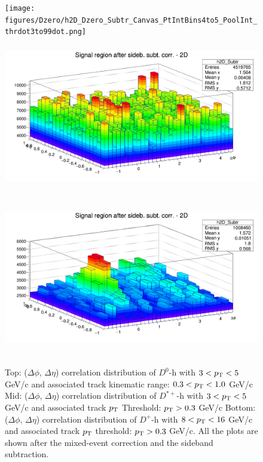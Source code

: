 \begin{figure}
\centering
{\texttt{[image: figures/Dzero/h2D\_Dzero\_Subtr\_Canvas\_PtIntBins4to5\_PoolInt\_thrdot3to99dot.png]}}
{\includegraphics[width=0.9\linewidth, height = 7cm]{figures/Dstar_wEFF/h2D_Dstar_Subtr_Canvas_PtIntBins2to3_PoolInt_thr0dot3to99dot0.png}}
{\includegraphics[width=0.9\linewidth, height = 7cm]{figures/DplusPlotsweff/h2D_Dplus_Subtr_Canvas_PtIntBins8to10_PoolInt_thr0dot3to99dot0.png}}
\caption{Top: ($\Delta\phi$, $\Delta\eta$) correlation distribution of $D^{0}$-h with $3 < p_{\rm T} < 5$ GeV/c and associated track kinematic range: $0.3 < p_{\rm T} < 1.0$ GeV/c
Mid: ($\Delta\phi$, $\Delta\eta$) correlation distribution of $D^{*+}$-h with $3 < p_{\rm T} < 5$ GeV/c and associated track $p_{\rm T}$ Threshold: $p_{\rm T} > 0.3$ GeV/c
Bottom: ($\Delta\phi$, $\Delta\eta$) correlation distribution of $D^{+}$-h with $8 < p_{\rm T} < 16$ GeV/c and associated track $p_{\rm T}$ threshold: $p_{\rm T} > 0.3$ GeV/c. All the plots are shown after the mixed-event correction and the sideband subtraction.}
\label{Dsubtr2D}

\end{figure}
\clearpage
%
